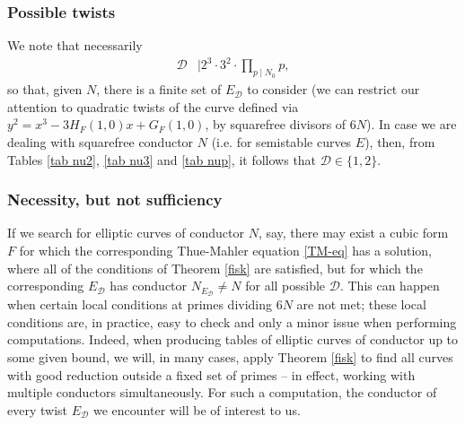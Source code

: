 \subsubsection{Possible twists}
We note that necessarily
\begin{align} \label{froggie}
\mathcal{D} &\mid 2^3 \cdot 3^2 \cdot \prod_{p \mid N_0} p,
\end{align}
so that, given $N$, there is a finite set of $E_{\mathcal{D}}$ to consider (we can restrict our attention to quadratic twists of the curve defined via
$y^2=x^3 - 3 H_F(1,0) x  + G_F (1,0)$,
by squarefree divisors of $6N$). In  case we are dealing with squarefree conductor $N$ (i.e. for semistable curves $E$), then, from Tables \ref{tab nu2}, \ref{tab nu3} and \ref{tab nup}, it follows that $\mathcal{D} \in \{ 1, 2 \}$.


\subsubsection{Necessity, but not sufficiency}
If we search for elliptic curves of conductor $N$, say, there may exist a cubic form $F$ for which the corresponding Thue-Mahler equation \eqref{TM-eq}  has a 
solution, where all of the conditions of Theorem \ref{fisk} are satisfied, but for which the corresponding  $E_{\mathcal{D}}$ has conductor $N_{E_{\mathcal{D}}} \neq N$ for all possible $\mathcal{D}$. This can happen when 
certain local conditions at primes dividing $6N$ are not met; these local conditions are, in practice, easy to check and only a minor issue when 
performing computations. Indeed, when producing tables of elliptic curves of conductor up to some given bound, we will, in many cases,  apply Theorem \ref{fisk} to find all curves with good reduction outside a fixed set of primes -- in effect, working with 
multiple conductors simultaneously. For such a computation, the conductor of every twist $E_{\mathcal{D}}$ we encounter will be of interest to 
us. 

